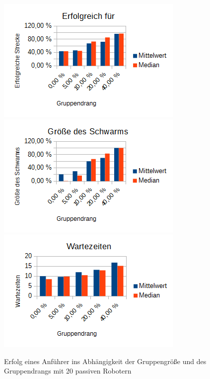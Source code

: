 \begin{figure}[h]
	\includegraphics[width=\sectionLeaderPictureWidth , keepaspectratio]{graphics/Statistics/Leader/FlockSize/20_1.png}
	\includegraphics[width=\sectionLeaderPictureWidth , keepaspectratio]{graphics/Statistics/Leader/FlockSize/20_2.png}
	\includegraphics[width=\sectionLeaderPictureWidth , keepaspectratio]{graphics/Statistics/Leader/FlockSize/20_3.png}
	\caption{Erfolg eines Anführer ins Abhängigkeit der Gruppengröße und des Gruppendrangs mit 20 passiven Robotern}
	\label{pic:LeaderSize20}
\end{figure}

